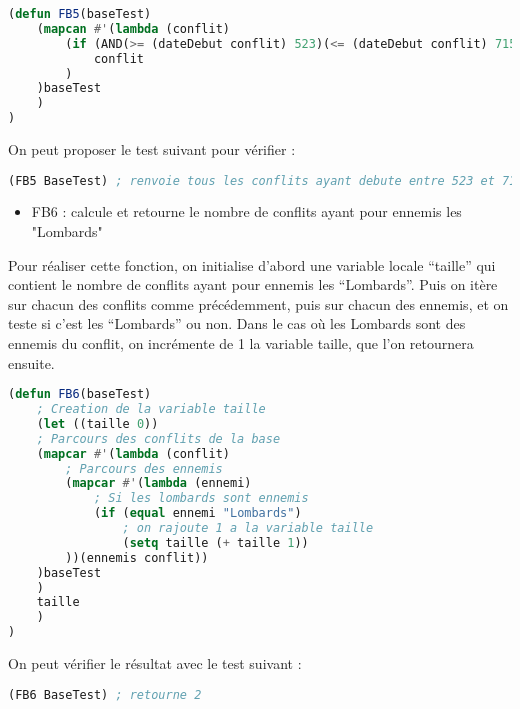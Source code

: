 \documentclass[a4paper, 12pt]{article}
\begin{document}
\begin{lstlisting}[language=Lisp]
(defun FB5(baseTest)
    (mapcan #'(lambda (conflit)
        (if (AND(>= (dateDebut conflit) 523)(<= (dateDebut conflit) 715))
            conflit
        )
    )baseTest
    )
)
\end{lstlisting}
\vspace{2mm}

On peut proposer le test suivant pour vérifier :
\vspace{2mm}

\begin{lstlisting}[language=Lisp]
(FB5 BaseTest) ; renvoie tous les conflits ayant debute entre 523 et 715
\end{lstlisting}

\vspace{5mm}

\begin{itemize}[label=\textbullet]
\item FB6 : calcule et retourne le nombre de conflits ayant pour ennemis les "Lombards"
\end{itemize}
\vspace{3mm}

Pour réaliser cette fonction, on initialise d’abord une variable locale “taille” qui contient le nombre de conflits ayant pour ennemis les “Lombards”. Puis on itère sur chacun des conflits comme précédemment, puis sur chacun des ennemis, et on teste si c’est les “Lombards” ou non. Dans le cas où les Lombards sont des ennemis du conflit, on incrémente de 1 la variable taille, que l’on retournera ensuite.
\vspace{2mm}

\begin{lstlisting}[language=Lisp]
(defun FB6(baseTest)
    ; Creation de la variable taille
    (let ((taille 0))
    ; Parcours des conflits de la base
    (mapcar #'(lambda (conflit)
        ; Parcours des ennemis
        (mapcar #'(lambda (ennemi)
            ; Si les lombards sont ennemis
            (if (equal ennemi "Lombards")
                ; on rajoute 1 a la variable taille
                (setq taille (+ taille 1))
        ))(ennemis conflit))
    )baseTest
    )
    taille
    )
)
\end{lstlisting}
\vspace{2mm}

On peut vérifier le résultat avec le test suivant :
\vspace{2mm}

\begin{lstlisting}[language=Lisp]
(FB6 BaseTest) ; retourne 2
\end{lstlisting}
\vspace{5mm}
\end{document}

